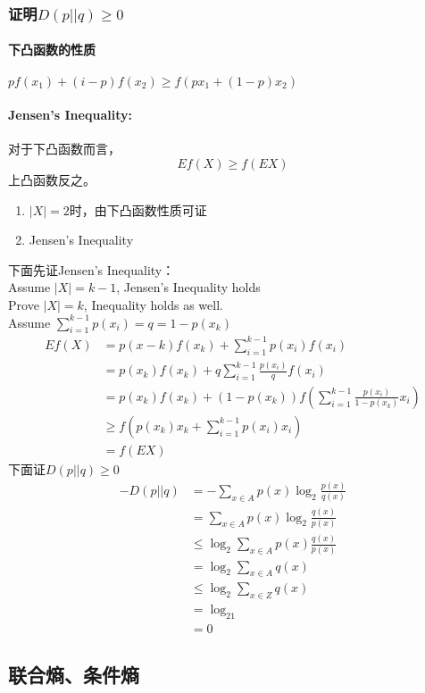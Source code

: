 \documentclass[a4paper, 12pt]{article}
\begin{document}
    \subsubsection{证明$D(p||q)\ge0$}
    \paragraph{下凸函数的性质} $pf(x_1)+(i-p)f(x_2)\ge f(px_1+(1-p)x_2)$
    \paragraph{Jensen's Inequality:} 对于下凸函数而言，
    \[Ef(X)\ge f(EX)\]
    上凸函数反之。
    \begin{enumerate}
        \item $|X|=2$时，由下凸函数性质可证
        \item Jensen's Inequality
    \end{enumerate}
    下面先证Jensen's Inequality：\\
    Assume $|X|=k-1$, Jensen's Inequality holds\\
    Prove $|X|=k$, Inequality holds as well.\\
    Assume $\sum_{i=1}^{k-1}p(x_i)=q=1-p(x_k)$
    \begin{align}
        Ef(X)&=p(x-k)f(x_k)+\sum_{i=1}^{k-1}p(x_i)f(x_i)\\
        &=p(x_k)f(x_k)+q\sum_{i=1}^{k-1}\frac{p(x_i)}{q}f(x_i)\\
        &=p(x_k)f(x_k)+(1-p(x_k))f(\sum_{i=1}^{k-1}\frac{p(x_i)}{1-p(x_k)}x_i)\\
        &\ge f(p(x_k)x_k+\sum_{i=1}^{k-1}p(x_i)x_i)\\
        &=f(EX)
    \end{align}
    下面证$D(p||q)\ge0$\\
    \begin{align}
        -D(p||q)&=-\sum_{x\in A}p(x)\log_2\frac{p(x)}{q(x)}\\
        &=\sum_{x\in A}p(x)\log_2\frac{q(x)}{p(x)}\\
        &\le \log_2\sum_{x\in A}p(x)\frac{q(x)}{p(x)}\\
        &=\log_2\sum_{x\in A}q(x)\\
        &\le \log_2\sum_{x\in Z}q(x)\\
        &=\log_21\\
        &=0
    \end{align}
    \subsection{联合熵、条件熵}
\end{document}
